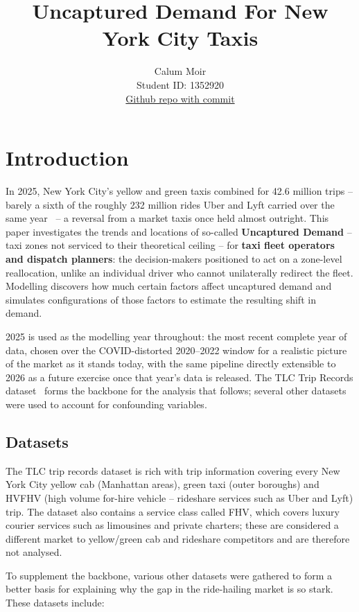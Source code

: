 \documentclass[11pt]{article}
\title{\textbf{Uncaptured Demand For New York City Taxis} \\ }
\author{
Calum Moir \\
Student ID: 1352920 \\
\href{https://github.com/cjboingboing/nyc-taxi-uncaptured-demand}{Github repo with commit}
}
\begin{document}
\maketitle

\section{Introduction}

In 2025, New York City's yellow and green taxis combined for 42.6 million trips -- barely a sixth of the roughly 232 million rides Uber and Lyft
carried over the same year~\cite{tlc_trip_data} -- a reversal from a market taxis once held almost outright. This paper investigates
the trends and locations of so-called \textbf{Uncaptured Demand} -- taxi zones not serviced to their theoretical ceiling -- for \textbf{taxi fleet operators
and dispatch planners}: the decision-makers positioned to act on a zone-level reallocation, unlike an individual driver who cannot unilaterally redirect
the fleet. Modelling discovers how much certain factors affect uncaptured demand and simulates configurations of those factors to estimate the resulting
shift in demand.

2025 is used as the modelling year throughout: the most recent complete year of data, chosen over the COVID-distorted 2020--2022 window for a realistic
picture of the market as it stands today, with the same pipeline directly extensible to 2026 as a future exercise once that year's data is released. The
TLC Trip Records dataset~\cite{tlc_trip_data} forms the backbone for the analysis that follows; several other datasets were used to account for confounding variables.


\subsection{Datasets}
The TLC trip records dataset is rich with trip information covering every New York City yellow cab (Manhattan areas),
green taxi (outer boroughs) and HVFHV (high volume for-hire vehicle -- rideshare services such as Uber and Lyft) trip. The dataset also contains a service class
called FHV, which covers luxury courier services such as limousines and private charters; these are considered
a different market to yellow/green cab and rideshare competitors and are therefore not analysed.

To supplement the backbone, various other datasets were gathered to form a better basis for explaining why the gap in
the ride-hailing market is so stark. These datasets include:
\end{document}
